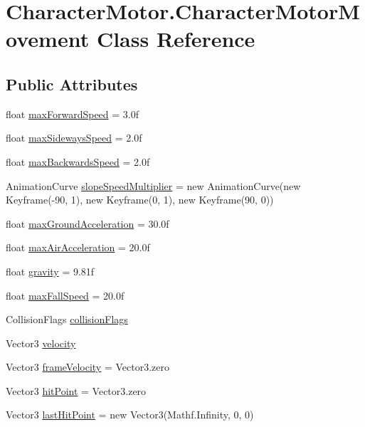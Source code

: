 \hypertarget{class_character_motor_1_1_character_motor_movement}{}\section{Character\+Motor.\+Character\+Motor\+Movement Class Reference}
\label{class_character_motor_1_1_character_motor_movement}
\subsection*{Public Attributes}
\begin{DoxyCompactItemize}
\item 
float \hyperlink{class_character_motor_1_1_character_motor_movement_aa820360350daf9692ded079eb05a9556}{max\+Forward\+Speed} = 3.\+0f
\item 
float \hyperlink{class_character_motor_1_1_character_motor_movement_a027288f30c506ef80b64ea0903642d03}{max\+Sideways\+Speed} = 2.\+0f
\item 
float \hyperlink{class_character_motor_1_1_character_motor_movement_a2f6ed24c7e60a10e62aefa33741b0eb5}{max\+Backwards\+Speed} = 2.\+0f
\item 
Animation\+Curve \hyperlink{class_character_motor_1_1_character_motor_movement_ab157f4037ba87d83810d2bf59b78803e}{slope\+Speed\+Multiplier} = new Animation\+Curve(new Keyframe(-\/90, 1), new Keyframe(0, 1), new Keyframe(90, 0))
\item 
float \hyperlink{class_character_motor_1_1_character_motor_movement_a0968f793fea8120298e5ec2d721ec3a2}{max\+Ground\+Acceleration} = 30.\+0f
\item 
float \hyperlink{class_character_motor_1_1_character_motor_movement_a0a985e4edd7576f3657d379972dc077e}{max\+Air\+Acceleration} = 20.\+0f
\item 
float \hyperlink{class_character_motor_1_1_character_motor_movement_ac8c8626de028fa14bd370baef3ac4393}{gravity} = 9.\+81f
\item 
float \hyperlink{class_character_motor_1_1_character_motor_movement_ae41d6a91868b3664fe183b45bf831505}{max\+Fall\+Speed} = 20.\+0f
\item 
Collision\+Flags \hyperlink{class_character_motor_1_1_character_motor_movement_aac4344120b66bff82cbfb55b388cde77}{collision\+Flags}
\item 
Vector3 \hyperlink{class_character_motor_1_1_character_motor_movement_a602814fda948d4dbc79a2b4f18386ce1}{velocity}
\item 
Vector3 \hyperlink{class_character_motor_1_1_character_motor_movement_a9a11d4502ed9cb50922c1198093af7b3}{frame\+Velocity} = Vector3.\+zero
\item 
Vector3 \hyperlink{class_character_motor_1_1_character_motor_movement_a359dedb4d215a06ebc2b81a137634d4a}{hit\+Point} = Vector3.\+zero
\item 
Vector3 \hyperlink{class_character_motor_1_1_character_motor_movement_a10fee81a506f0445be8905e3de83a0bc}{last\+Hit\+Point} = new Vector3(Mathf.\+Infinity, 0, 0)
\end{DoxyCompactItemize}


